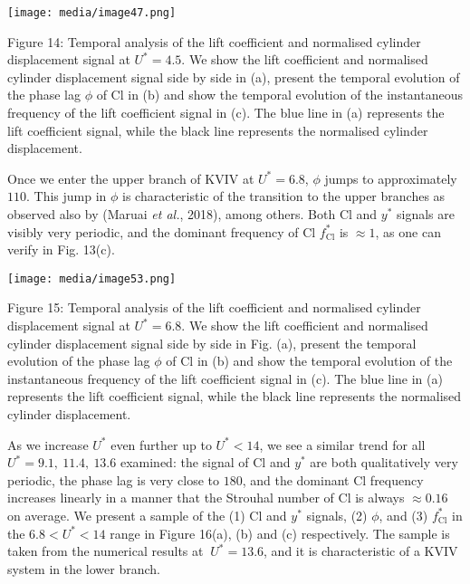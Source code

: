 \documentclass[]{article}
\begin{document}
\texttt{[image: media/image47.png]}

\protect\hypertarget{_Toc41048837}{}{}Figure 14: Temporal analysis of
the lift coefficient and normalised cylinder displacement signal at
\(U^{*} = 4.5\). We show the lift coefficient and normalised cylinder
displacement signal side by side in (a), present the temporal evolution
of the phase lag \(\phi\) of Cl in (b) and show the temporal evolution
of the instantaneous frequency of the lift coefficient signal in (c).
The blue line in (a) represents the lift coefficient signal, while the
black line represents the normalised cylinder displacement.

Once we enter the upper branch of KVIV at \(U^{*} = 6.8\), \(\phi\)
jumps to approximately \(110\). This jump in \(\phi\) is characteristic
of the transition to the upper branches as observed also by (Maruai
\emph{et al.}, 2018), among others. Both Cl and \(y^{*}\) signals are
visibly very periodic, and the dominant frequency of Cl
\(f_{\text{Cl}}^{*}\) is \(\approx 1\), as one can verify in Fig. 13(c).

\texttt{[image: media/image53.png]}

\protect\hypertarget{_Toc41048838}{}{}Figure 15: Temporal analysis of
the lift coefficient and normalised cylinder displacement signal at
\(U^{*} = 6.8\). We show the lift coefficient and normalised cylinder
displacement signal side by side in Fig. (a), present the temporal
evolution of the phase lag \(\phi\) of Cl in (b) and show the temporal
evolution of the instantaneous frequency of the lift coefficient signal
in (c). The blue line in (a) represents the lift coefficient signal,
while the black line represents the normalised cylinder displacement.

As we increase \(U^{*}\) even further up to \(U^{*} < 14\), we see a
similar trend for all \(U^{*} = 9.1,\ 11.4,\ 13.6\) examined: the signal
of Cl and \(y^{*}\) are both qualitatively very periodic, the phase lag
is very close to \(180\), and the dominant Cl frequency increases
linearly in a manner that the Strouhal number of Cl is always
\(\approx 0.16\) on average. We present a sample of the (1) Cl and
\(y^{*}\) signals, (2) \(\phi\), and (3)
\protect\hypertarget{_Hlk23621866}{}{}\(f_{\text{Cl}}^{*}\) in the
\(6.8 < U^{*} < 14\) range in Figure 16(a), (b) and (c) respectively.
The sample is taken from the numerical results at \(\ U^{*} = 13.6\),
and it is characteristic of a KVIV system in the lower branch.
\end{document}
